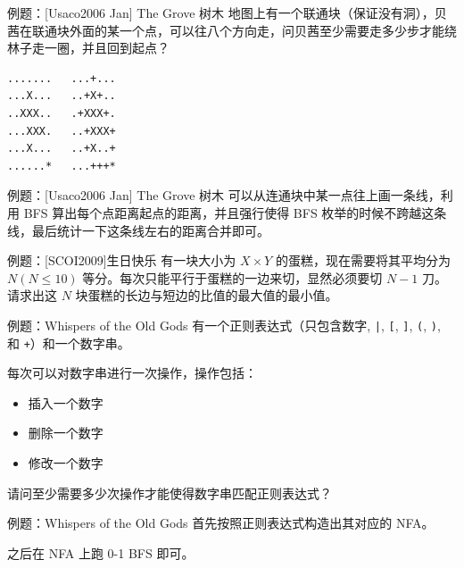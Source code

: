 \documentclass[12pt,aspectratio=169]{beamer}
\begin{document}
\begin{frame}[fragile]{例题：[Usaco2006 Jan] The Grove 树木}
  地图上有一个联通块（保证没有洞），贝茜在联通块外面的某一个点，可以往八个方向走，问贝茜至少需要走多少步才能绕林子走一圈，并且回到起点？

  \begin{verbatim}
.......   ...+...
...X...   ..+X+..
..XXX..   .+XXX+.
...XXX.   ..+XXX+
...X...   ..+X..+
......*   ...+++*
  \end{verbatim}
\end{frame}

\begin{frame}[fragile]{例题：[Usaco2006 Jan] The Grove 树木}
  可以从连通块中某一点往上画一条线，利用 BFS 算出每个点距离起点的距离，并且强行使得 BFS 枚举的时候不跨越这条线，最后统计一下这条线左右的距离合并即可。
\end{frame}

\begin{frame}[fragile]{例题：[SCOI2009]生日快乐}
  有一块大小为 $X \times Y$ 的蛋糕，现在需要将其平均分为 $N (N \le 10)$ 等分。每次只能平行于蛋糕的一边来切，显然必须要切 $N-1$ 刀。请求出这 $N$ 块蛋糕的长边与短边的比值的最大值的最小值。

  
\end{frame}

\begin{frame}[fragile]{例题：Whispers of the Old Gods}
  有一个正则表达式（只包含数字, \verb!|!, \verb|[|, \verb|]|, \verb|(|, \verb|)|, 和 \verb|+|）和一个数字串。

  每次可以对数字串进行一次操作，操作包括：

  \begin{itemize}
    \item 插入一个数字
    \item 删除一个数字
    \item 修改一个数字
  \end{itemize}

  请问至少需要多少次操作才能使得数字串匹配正则表达式？
\end{frame}

\begin{frame}[fragile]{例题：Whispers of the Old Gods}
  首先按照正则表达式构造出其对应的 NFA。

  之后在 NFA 上跑 0-1 BFS 即可。
\end{frame}
\end{document}
